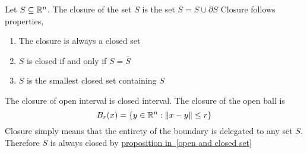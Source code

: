 \documentclass[11pt]{article}
\begin{document}
\begin{defn}
  Let $S\subseteq \mathbb{R}^n$. The closure of the set $S$ is the set $\overline S = S\cup \partial S$ Closure follows properties,
  \begin{enumerate}
    \item The closure is always a closed set
    \item $S$ is closed if and only if $S = \overline S$
    \item $S$ is the smallest closed set containing $S$
  \end{enumerate}
  \begin{rem}
    The closure of open interval is closed interval. The closure of the open ball is
    \[
      B_r(x)=\{y\in \mathbb{R}^n :\| x-y\|\leq r\}
    \]
    Closure simply means that the entirety of the boundary is delegated to any set $S$. Therefore $S$ is always closed by \hyperref[open and closed set]{proposition in~\ref{open and closed set}}
  \end{rem}
\end{defn}
\end{document}
